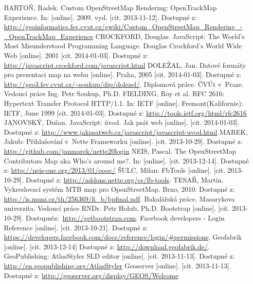\documentclass[11pt,a4paper,titlepage,oneside]{book}
\begin{document}
\newpage
{}
\begin{thebibliography}{99}
	 BARTOŇ, Radek. Custom OpenStreetMap Rendering: Open\-TrackMap Experience. In: [online]. 2009. vyd. [cit. 2013-11-12]. Dostupné z:  \url{http://geoinformatics.fsv.cvut.cz/gwiki/Custom_OpenStreetMap_Rendering_-_OpenTrackMap_Experience}
	CROCKFORD, Douglas. JavaScript: The World's Most Misunderstood Programming Language. Douglas Crockford's World Wide Web [online]. 2001 [cit. 2014-01-03]. Dostupné z: \url{http://javascript.crockford.com/javascript.html}
	DOLEŽAL, Jan. Datové formáty pro prezentaci map na webu [online]. Praha, 2005 [cit. 2014-01-03]. Dostupné z: \url{http://geo3.fsv.cvut.cz/~soukup/dip/dolezel/}. Diplomová práce. ČVÚt v~Praze. Vedoucí práce Ing. Petr Soukup, Ph.D.
	FIELDING, Roy et al. RFC 2616: Hypertext Transfer Protocol HTTP/1.1. In: IETF [online]. Fremont(Kalifornie): IETF, June 1999 [cit. 2014-01-03]. Dostupné z: \url{http://tools.ietf.org/html/rfc2616}
        JANOVSKÝ, Dušan. JavaScript: úvod. Jak psát web [online]. [cit. 2014-01-03]. Dostupné z: \url{http://www.jakpsatweb.cz/javascript/javascript-uvod.html}
	MAREK, Jakub: Přihlašování v~Nette Frameworku [online].  [cit. 2013-10-29]. Dostupné z: \url{http://github.com/janmarek/nette20login}
	NEIS, Pascal. The OpenStreetMap Contributors Map aka Who’s around me?. In: [online]. [cit. 2013-12-14]. Dostupné z: \url{http://neis-one.org/2013/01/oooc/}
	 ŠULC, Milan: FbTools [online].  [cit. 2013-10-29]. Dostupné z: \url{http://addons.nette.org/cs/fb-tools}.
          \newpage
	TESAŘ, Martin. Vykreslovací systém MTB map pro OpenStreetMap. Brno, 2010. Dostupné z: \url{http://is.muni.cz/th/256369/fi_b/bpfinal.pdf}. Bakalářská práce. Masarykova univerzita. Vedoucí práce RNDr. Petr Holub, Ph.D.
	Bootstrap [online].  [cit. 2013-10-29]. Dostupné\newline z:~\url{http://getbootstrap.com}.
	 Facebook developers - Login Reference [online]. [cit. 2013-10-21]. Dostupné z: \url{https://developers.facebook.com/docs/reference/login/#permissions}.
	Geofabrik [online]. [cit. 2013-12-14] Dostupné z: \url{http://download.geofabrik.de/}.
	GeoPublishing: AtlasStyler SLD editor [online]. [cit. 2013-11-13]. Dostupné z: \url{http://en.geopublishing.org/AtlasStyler}
	Geoserver [online]. [cit. 2013-11-13]. Dostupné z: \url{http://geoserver.org/display/GEOS/Welcome}

\end{thebibliography}
\end{document}
